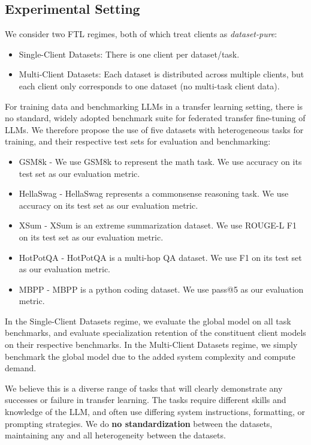 \documentclass{article}
\theoremstyle{plain}
\theoremstyle{definition}
\theoremstyle{remark}
\begin{document}
\subsection{Experimental Setting}
\label{sec:exp-regimes}

We consider two FTL regimes, both of which treat clients as \emph{dataset-pure}:
\begin{itemize}
    \item Single-Client Datasets: There is one client per dataset/task.
    \item Multi-Client Datasets: Each dataset is distributed across multiple clients, but each client only corresponds to one dataset (no multi-task client data). 
\end{itemize}

For training data and benchmarking LLMs in a transfer learning setting, there is no standard, widely adopted benchmark suite for federated transfer fine-tuning of LLMs. We therefore propose the use of five datasets with heterogeneous tasks for training, and their respective test sets for evaluation and benchmarking:
\begin{itemize}
    \item GSM8k - We use GSM8k to represent the math task. We use accuracy on its test set as our evaluation metric. 
    \item HellaSwag - HellaSwag represents a commonsense reasoning task. We use accuracy on its test set as our evaluation metric. 
    \item XSum - XSum is an extreme summarization dataset. We use ROUGE-L F1 on its test set as our evaluation metric. 
    \item HotPotQA - HotPotQA is a multi-hop QA dataset. We use F1 on its test set as our evaluation metric. 
    \item MBPP - MBPP is a python coding dataset. We use pass@5 as our evaluation metric.
\end{itemize}

In the Single-Client Datasets regime, we evaluate the global model on all task benchmarks, and evaluate specialization retention of the constituent client models on their respective benchmarks. In the Multi-Client Datasets regime, we simply benchmark the global model due to the added system complexity and compute demand. 

We believe this is a diverse range of tasks that will clearly demonstrate any successes or failure in transfer learning. The tasks require different skills and knowledge of the LLM, and often use differing system instructions, formatting, or prompting strategies. We do \textbf{no standardization} between the datasets, maintaining any and all heterogeneity between the datasets. 
\end{document}
